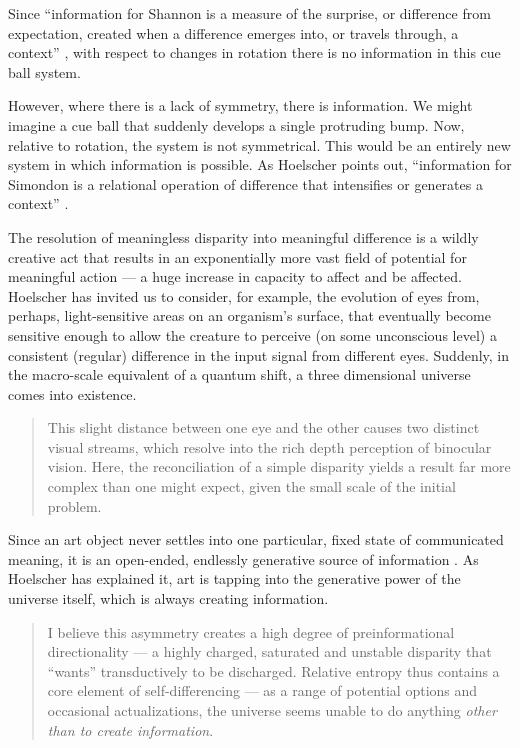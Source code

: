 \documentclass[letterpaper]{article}
\begin{document}
    Since “information for Shannon is a measure of the surprise, or difference from expectation, created when a difference emerges into, or travels through, a context” \citep[p.6]{HoelscherArtAsInfrmtn2021}, with respect to changes in rotation there is no information in this cue ball system. 
    
    However, where there is a lack of symmetry, there is information. We might imagine a cue ball that suddenly develops a single protruding bump. Now, relative to rotation, the system is not symmetrical. This would be an entirely new system in which information is possible. As Hoelscher points out, “information for Simondon is a relational operation of difference that intensifies or generates a context” \citep[p.6]{HoelscherArtAsInfrmtn2021}. 

    The resolution of meaningless disparity into meaningful difference is a wildly creative act that results in an exponentially more vast field of potential for meaningful action — a huge increase in capacity to affect and be affected. Hoelscher has invited us to consider, for example, the evolution of eyes from, perhaps, light-sensitive areas on an organism's surface, that eventually become sensitive enough to allow the creature to perceive (on some unconscious level) a consistent (regular) difference in the input signal from different eyes. Suddenly, in the macro-scale equivalent of a quantum shift, a three dimensional universe comes into existence.

    \begin{quote}
        This slight distance between one eye and the other causes two distinct visual streams, which resolve into the rich depth perception of binocular vision. Here, the reconciliation of a simple disparity yields a result far more complex than one might expect, given the small scale of the initial problem. \citep[p.5]{HoelscherArtAsInfrmtn2021}
    \end{quote}

    Since an art object never settles into one particular, fixed state of communicated meaning, it is an open-ended, endlessly generative source of information \citep[p.7]{HoelscherThPtcsOfPhsSpc2014}. As Hoelscher has explained it, art is tapping into the generative power of the universe itself, which is always creating information.

    \begin{quote}
        I believe this asymmetry creates a high degree of preinformational directionality — a highly charged, saturated and unstable disparity that “wants” transductively to be discharged. Relative entropy thus contains a core element of self-differencing — as a range of potential options and occasional actualizations, the universe seems unable to do anything \emph{other than to create information}.
    \end{quote}
\end{document}
